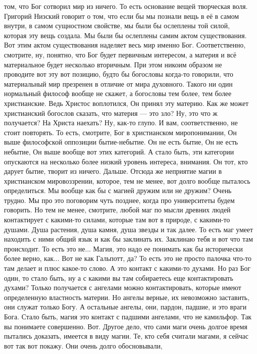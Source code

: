 том, что Бог сотворил мир из ничего. То есть основание вещей творческая воля.
Григорий Низский говорит о том, что если бы мы познали вещь в её в самом внутри,
в самом сущностном свойстве, мы были бы ослеплены той силой, которая эту вещь
создала. Мы были бы ослеплены самим актом существования. Вот этим актом
существования наделяет весь мир именно Бог. Соответственно, смотрите, ну,
понятно, что Бог будет первичным интересом, а материя и всё материальное будет
несколько вторичным. При этом никоим образом не проводите вот эту вот позицию,
будто бы богословы когда-то говорили, что материальный мир презренен в отличие
от мира духовного. Такого ни один нормальный философ вообще не скажет, а
богословы тем более, тем более христианские. Ведь Христос воплотился, Он принял
эту материю. Как же может христианский богослов сказать, что материя — это зло?
Ну, это что ж получается? На Христа наехать? Ну, как-то глупо. И вам,
соответственно, не стоит повторять. То есть, смотрите, Бог в христианском
миропонимании, Он выше философской оппозиции бытие-небытие. Он не есть бытие, Он
не есть небытие, Он выше вообще вот этих категорий. А стало быть, эти категории
опускаются на несколько более низкий уровень интереса, внимания. Он тот, кто
дарует бытие, творит из ничего. Дальше. Отсюда же неприятие магии в христианском
мировоззрении, которое, тем не менее, вот долго вообще пыталось определиться. Мы
вообще как бы с магией дружим или не дружим? Очень трудно. Мы про это поговорим
чуть позднее, когда про университеты будем говорить. Но тем не менее, смотрите,
любой маг по мысли древних людей контактирует с какими-то силами, которые там
вот в природе, с какими-то душами. Душа растения, душа камня, душа звезды и так
далее. То есть маг умеет находить с ними общий язык и как бы заклинать их.
Заклинаю тебя и вот что там происходит. То есть это не... Магия, это надо ее
понимать как бы исторически более верно, как... Вот не как Гальпотт, да? То есть
это не просто палочка что-то там делает и плюс какое-то слово. А это контакт с
какими-то духами. Но раз Бог один, то стало быть, ну а с какими вы там
собираетесь еще контактировать духами? Только получается с ангелами можно
контактировать, которые имеют определенную властность материи. Но ангелы верные,
их невозможно заставить, они служат только Богу. А остальные ангелы, они,
пардон, падшие, и это враги Бога. Стало быть, магия это контакт с падшими
ангелами, что не камильфор. Так вы понимаете совершенно. Вот. Другое дело, что
сами маги очень долгое время пытались доказать, имеется в виду магии. Те, кто
себя считали магами, я сейчас вот так вот покажу. Они очень долго обосновывали,
